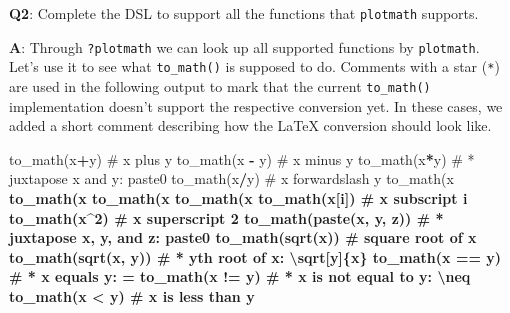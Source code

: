 \documentclass[
]{krantz}
\makeatletter
\newenvironment{Shaded}{\begin{snugshade}}{\end{snugshade}}
\newcommand{\CommentTok}[1]{\textcolor[rgb]{0.56,0.35,0.01}{\textit{#1}}}
\newcommand{\DecValTok}[1]{\textcolor[rgb]{0.00,0.00,0.81}{#1}}
\newcommand{\KeywordTok}[1]{\textcolor[rgb]{0.13,0.29,0.53}{\textbf{#1}}}
\newcommand{\NormalTok}[1]{#1}
\newcommand{\OperatorTok}[1]{\textcolor[rgb]{0.81,0.36,0.00}{\textbf{#1}}}
\newcommand{\StringTok}[1]{\textcolor[rgb]{0.31,0.60,0.02}{#1}}
\newenvironment{kframe}{%
\medskip{}
\setlength{\fboxsep}{.8em}
 \def\at@end@of@kframe{}%
 \ifinner\ifhmode%
  \def\at@end@of@kframe{\end{minipage}}%
  \begin{minipage}{\columnwidth}%
 \fi\fi%
 \def\FrameCommand##1{\hskip\@totalleftmargin \hskip-\fboxsep
 \colorbox{shadecolor}{##1}\hskip-\fboxsep
     \hskip-\linewidth \hskip-\@totalleftmargin \hskip\columnwidth}%
 \MakeFramed {\advance\hsize-\width
   \@totalleftmargin\z@ \linewidth\hsize
   \@setminipage}}%
 {\par\unskip\endMakeFramed%
 \at@end@of@kframe}
\renewenvironment{Shaded}{\begin{kframe}}{\end{kframe}}
\renewcommand{\KeywordTok} [1]{\textcolor[rgb]{0.00,0.44,0.13}{{#1}}}
\renewcommand{\DecValTok}  [1]{\textcolor[rgb]{0.25,0.63,0.44}{{#1}}}
\renewcommand{\StringTok}  [1]{\textcolor[rgb]{0.25,0.44,0.63}{{#1}}}
\renewcommand{\CommentTok} [1]{\textcolor[rgb]{0.38,0.63,0.69}{{#1}}}
\renewcommand{\NormalTok}  [1]{{#1}}
\makeatother
\begin{document}
\textbf{{Q2}}: Complete the DSL to support all the functions that \texttt{plotmath} supports.

\textbf{{A}}: Through \texttt{?plotmath} we can look up all supported functions by \texttt{plotmath}. Let's use it to see what \texttt{to\_math()} is supposed to do. Comments with a star (\texttt{*}) are used in the following output to mark that the current \texttt{to\_math()} implementation doesn't support the respective conversion yet. In these cases, we added a short comment describing how the LaTeX conversion should look like.

\begin{Shaded}
\begin{Highlighting}[]
\KeywordTok{to_math}\NormalTok{(x}\OperatorTok{+}\NormalTok{y)             }\CommentTok{#   x plus y }
\KeywordTok{to_math}\NormalTok{(x }\OperatorTok{-}\StringTok{ }\NormalTok{y)           }\CommentTok{#   x minus y }
\KeywordTok{to_math}\NormalTok{(x}\OperatorTok{*}\NormalTok{y)             }\CommentTok{# * juxtapose x and y: paste0}
\KeywordTok{to_math}\NormalTok{(x}\OperatorTok{/}\NormalTok{y)             }\CommentTok{#   x forwardslash y}
\KeywordTok{to_math}\NormalTok{(x }\OperatorTok{%
\KeywordTok{to_math}\NormalTok{(x }\OperatorTok{%
\KeywordTok{to_math}\NormalTok{(x }\OperatorTok{%
\KeywordTok{to_math}\NormalTok{(x }\OperatorTok{%
\KeywordTok{to_math}\NormalTok{(x[i])            }\CommentTok{#   x subscript i}
\KeywordTok{to_math}\NormalTok{(x}\OperatorTok{^}\DecValTok{2}\NormalTok{)             }\CommentTok{#   x superscript 2}
\KeywordTok{to_math}\NormalTok{(}\KeywordTok{paste}\NormalTok{(x, y, z))  }\CommentTok{# * juxtapose x, y, and z: paste0}
\KeywordTok{to_math}\NormalTok{(}\KeywordTok{sqrt}\NormalTok{(x))         }\CommentTok{#   square root of x}
\KeywordTok{to_math}\NormalTok{(}\KeywordTok{sqrt}\NormalTok{(x, y))      }\CommentTok{# * yth root of x: \textbackslash{}sqrt[y]\{x\}}
\KeywordTok{to_math}\NormalTok{(x }\OperatorTok{==}\StringTok{ }\NormalTok{y)          }\CommentTok{# * x equals y: =}
\KeywordTok{to_math}\NormalTok{(x }\OperatorTok{!=}\StringTok{ }\NormalTok{y)          }\CommentTok{# * x is not equal to y: \textbackslash{}neq}
\KeywordTok{to_math}\NormalTok{(x }\OperatorTok{<}\StringTok{ }\NormalTok{y)           }\CommentTok{#   x is less than y}
}}}}
\end{Highlighting}
\end{Shaded}
\end{document}
